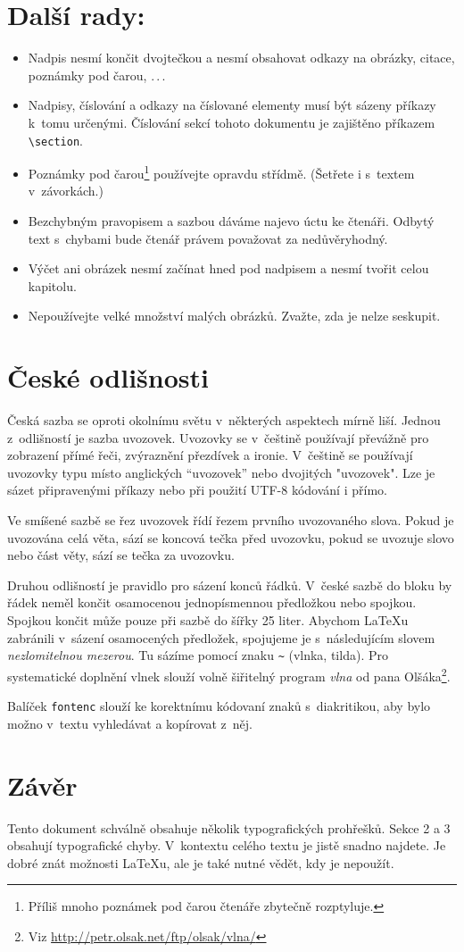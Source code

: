 \documentclass[a4paper, 10pt, twocolumn]{article}
\begin{document}
\section{Další rady:}
\begin{itemize}
\item Nadpis nesmí končit dvojtečkou a nesmí obsahovat odkazy na obrázky, citace,
poznámky pod čarou, .\,.\,.
\item Nadpisy, číslování a odkazy na číslované elementy musí být sázeny příkazy k~tomu určenými.
Číslování sekcí tohoto dokumentu je zajištěno příkazem \verb=\section=.
\item Poznámky pod čarou\footnote{Příliš mnoho poznámek pod čarou čtenáře zbytečně
rozptyluje.} používejte opravdu střídmě.
(Šetřete i s~textem v~závorkách.)
\item Bezchybným pravopisem a sazbou dáváme najevo úctu ke čtenáři.
Odbytý text s~chybami bude čtenář právem považovat za nedůvěryhodný.
\item Výčet ani obrázek nesmí začínat hned pod nadpisem a nesmí tvořit celou kapitolu.
\item Nepoužívejte velké množství malých obrázků.
Zvažte, zda je nelze seskupit.
\end{itemize}
\section{České odlišnosti}
Česká sazba se oproti okolnímu světu v~některých aspektech mírně liší.
Jednou z~odlišností je sazba uvozovek.
Uvozovky se v~češtině používají převážně pro zobrazení přímé řeči, zvýraznění
přezdívek a ironie. V~češtině se používají uvozovky typu  místo anglických
“uvozovek” nebo dvojitých "uvozovek".
Lze je sázet připravenými příkazy nebo při použití UTF-8 kódování i přímo. \par
Ve smíšené sazbě se řez uvozovek řídí řezem prvního uvozovaného slova.
Pokud je uvozována celá věta, sází se koncová tečka před uvozovku, pokud se uvozuje
slovo nebo část věty, sází se tečka za uvozovku. \par
Druhou odlišností je pravidlo pro sázení konců řádků.
V~české sazbě do bloku by řádek neměl končit osamocenou jednopísmennou předložkou nebo spojkou.
Spojkou  končit může pouze při sazbě do šířky 25 liter.
Abychom \LaTeX u zabránili v~sázení osamocených předložek, spojujeme je s~následujícím slovem \textit{nezlomitelnou mezerou}.
Tu sázíme pomocí znaku \verb|~| (vlnka, tilda).
Pro systematické doplnění vlnek slouží volně šiřitelný program \textit{vlna} od pana
Olšáka\footnote{Viz \url{http://petr.olsak.net/ftp/olsak/vlna/}}. \par
Balíček \verb=fontenc= slouží ke korektnímu kódovaní znaků s~diakritikou, aby bylo
možno v~textu vyhledávat a kopírovat z~něj.
\section{Závěr}
Tento dokument schválně obsahuje několik typografických prohřešků.
Sekce 2 a 3 obsahují typografické chyby.
V~kontextu celého textu je jistě snadno najdete.
Je dobré znát možnosti \LaTeX u, ale je také nutné vědět, kdy je nepoužít.
\end{document}
